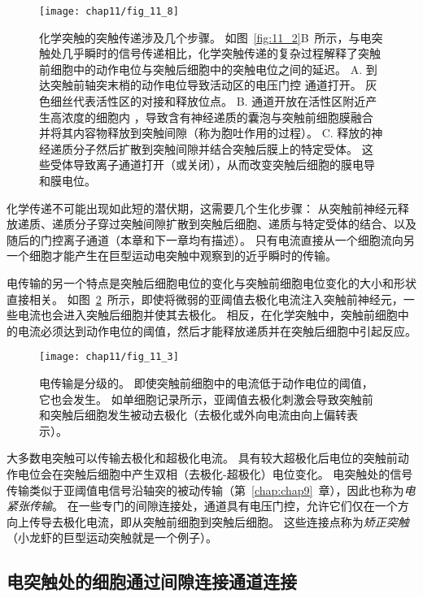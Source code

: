 \begin{figure}[htbp]
	\centering
	\texttt{[image: chap11/fig\_11\_8]}
	\caption{化学突触的突触传递涉及几个步骤。
		如图~\ref{fig:11_2}B~所示，与电突触处几乎瞬时的信号传递相比，化学突触传递的复杂过程解释了突触前细胞中的动作电位与突触后细胞中的突触电位之间的延迟。
		A. 到达突触前轴突末梢的动作电位导致活动区的电压门控  通道打开。
		灰色细丝代表活性区的对接和释放位点。
		B.  通道开放在活性区附近产生高浓度的细胞内 ，导致含有神经递质的囊泡与突触前细胞膜融合并将其内容物释放到突触间隙（称为胞吐作用的过程）。
		C. 释放的神经递质分子然后扩散到突触间隙并结合突触后膜上的特定受体。
		这些受体导致离子通道打开（或关闭），从而改变突触后细胞的膜电导和膜电位。}
	\label{fig:11_8}
\end{figure}


化学传递不可能出现如此短的潜伏期，这需要几个生化步骤：
从突触前神经元释放递质、递质分子穿过突触间隙扩散到突触后细胞、递质与特定受体的结合、以及随后的门控离子通道（本章和下一章均有描述）。
只有电流直接从一个细胞流向另一个细胞才能产生在巨型运动电突触中观察到的近乎瞬时的传输。


电传输的另一个特点是突触后细胞电位的变化与突触前细胞电位变化的大小和形状直接相关。
如图~\ref{fig:11_3}~所示，即使将微弱的亚阈值去极化电流注入突触前神经元，一些电流也会进入突触后细胞并使其去极化。
相反，在化学突触中，突触前细胞中的电流必须达到动作电位的阈值，然后才能释放递质并在突触后细胞中引起反应。


\begin{figure}[htbp]
	\centering
	\texttt{[image: chap11/fig\_11\_3]}
	\caption{电传输是分级的。
		即使突触前细胞中的电流低于动作电位的阈值，它也会发生。
		如单细胞记录所示，亚阈值去极化刺激会导致突触前和突触后细胞发生被动去极化（去极化或外向电流由向上偏转表示）。}
	\label{fig:11_3}
\end{figure}


大多数电突触可以传输去极化和超极化电流。
具有较大超极化后电位的突触前动作电位会在突触后细胞中产生双相（去极化-超极化）电位变化。
电突触处的信号传输类似于亚阈值电信号沿轴突的被动传输（第~\ref{chap:chap9}~章），因此也称为\textit{电紧张传输}。
在一些专门的间隙连接处，通道具有电压门控，允许它们仅在一个方向上传导去极化电流，即从突触前细胞到突触后细胞。
这些连接点称为\textit{矫正突触}
（小龙虾的巨型运动突触就是一个例子）。



\subsection{电突触处的细胞通过间隙连接通道连接}

